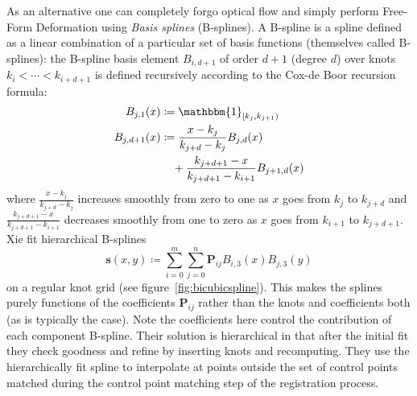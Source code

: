 As an alternative one can completely forgo optical flow and simply perform Free-Form Deformation\cite{xie2004} using \textit{Basis splines} (B-splines).
%
A B-spline is a spline defined as a linear combination of a particular set of basis functions (themselves called B-splines): the B-spline basis element \(B_{i, d+1}\) of order \(d+1\) (degree \(d\)) over knots \(k_i < \cdots < k_{i+d+1}\) is defined recursively according to the Cox-de Boor recursion formula\cite{de1971subroutine}:
\begin{align}
	B_{j,1} (x) &\coloneqq \mathbbm{1}_{[k_j, k_{j+1})} \\
	B_{j,d+1} (x) &\coloneqq \frac{x-k_j}{k_{j+d} - k_j} B_{j,d} (x) \\
	&\quad+ \frac{k_{j+d+1} - x}{k_{j+d+1} - k_{i+1}} B_{j+1,d} \nonumber (x)
\end{align}
where \(\frac{x-k_j}{k_{j+d} - k_j}\) increases smoothly from zero to one as \(x\) goes from \(k_j\) to \(k_{j+d}\) and \(\frac{k_{j+d+1} - x}{k_{j+d+1} - k_{i+1}}\) decreases smoothly from one to zero as \(x\) goes from \(k_{i+1}\) to \(k_{j+d+1}\).
%
Xie \etal\cite{xie2004} fit hierarchical B-splines 
\begin{equation}
	\mathbf{s}(x,y) \coloneqq \sum_{i=0}^m\sum_{j=0}^n \mathbf{P}_{ij} B_{i,3}(x) B_{j,3}(y)
\end{equation}
on a regular knot grid (see figure~\ref{fig:bicubicspline}).
%
This makes the splines purely functions of the coefficients \(\mathbf{P}_{ij}\) rather than the knots and coefficients both (as is typically the case).
%
Note the coefficients here control the contribution of each component B-spline.
%
Their solution is hierarchical in that after the initial fit they check goodness and refine by inserting knots and recomputing.
%
They use the hierarchically fit spline to interpolate at points outside the set of control points matched during the control point matching step of the registration process.
%
